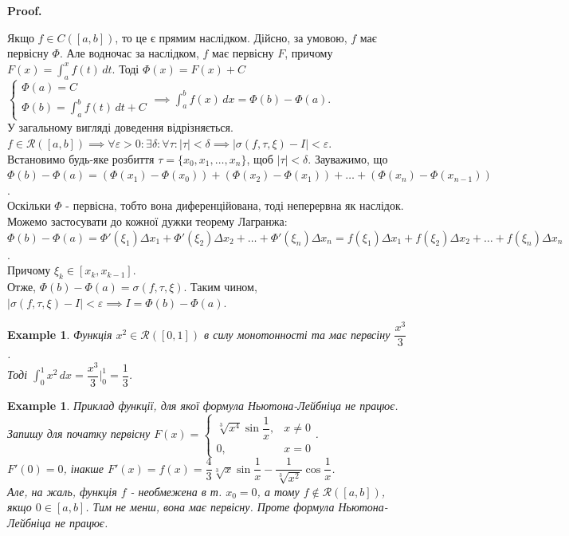 \documentclass[a4paper, 10pt]{article}
\makeatletter
\def\huge{\displaystyle}
\def\qed{$\blacksquare$}
\theoremstyle{theoremdd}
\theoremstyle{theoremdd}
\theoremstyle{theoremdd}
\theoremstyle{theoremdd}
\newtheorem{example}[theorem]{Example}
\theoremstyle{theoremdd}
\theoremstyle{theoremdd}
\theoremstyle{theoremdd}
\theoremstyle{theoremdd}
\renewenvironment{proof}[1][Proof.\\]{\par
\pushQED{\hfill \qed}%
\normalfont \topsep6\p@\@plus6\p@\relax
\trivlist
\item\relax
{\bfseries
#1\@addpunct{.}}\hspace\labelsep\ignorespaces
}{%
\popQED\endtrivlist\@endpefalse
}
\makeatother
\begin{document}
\begin{proof}
Якщо $f \in C([a,b])$, то це є прямим наслідком. Дійсно, за умовою, $f$ має первісну $\Phi$. Але водночас за наслідком, $f$ має первісну $F$, причому $F(x) = \huge\int_a^x f(t)\,dt$. Тоді $\Phi(x) = F(x) + C$\\
$\begin{cases}
\Phi(a) = C \\
\Phi(b) = \huge\int_a^b f(t)\,dt + C
\end{cases} \implies \huge\int_a^b f(x)\,dx = \Phi(b) - \Phi(a)$.
\bigskip \\
У загальному вигляді доведення відрізняється. \\
$f \in \mathcal{R}([a,b]) \implies \forall \varepsilon > 0: \exists \delta: \forall \tau: |\tau| < \delta \implies |\sigma(f, \tau, \xi)-I|<\varepsilon$.\\
Встановимо будь-яке розбиття $\tau = \{x_0,x_1,\dots,x_n\}$, щоб $|\tau| < \delta$. Зауважимо, що\\
$\Phi(b) - \Phi(a) = (\Phi(x_1)-\Phi(x_0)) + (\Phi(x_2)-\Phi(x_1)) + \dots + (\Phi(x_n)-\Phi(x_{n-1}))$.\\
Оскільки $\Phi$ - первісна, тобто вона диференційована, тоді неперервна як наслідок. Можемо застосувати до кожної дужки теорему Лагранжа:\\
$\Phi(b) - \Phi(a) = \Phi'(\xi_1) \Delta x_1 + \Phi'(\xi_2) \Delta x_2 + \dots + \Phi'(\xi_n)\Delta x_n = f(\xi_1)\Delta x_1 + f(\xi_2)\Delta x_2 + \dots + f(\xi_n)\Delta x_n$.\\
Причому $\xi_k \in [x_k,x_{k-1}]$.\\
Отже, $\Phi(b) - \Phi(a) = \sigma(f,\tau,\xi)$. Таким чином, $|\sigma(f, \tau, \xi) - I| < \varepsilon \implies I = \Phi(b) - \Phi(a)$.
\end{proof}

\begin{example}
Функція $x^2 \in \mathcal{R}([0,1])$ в силу монотонності та має первсіну $\dfrac{x^3}{3}$. \\ Тоді $\huge\int_0^1 x^2\,dx = \dfrac{x^3}{3} \Big|_0^1 = \dfrac{1}{3}$.
\end{example}

\begin{example}
Приклад функції, для якої формула Ньютона-Лейбніца не працює. Запишу для початку первісну $F(x) = \begin{cases} \sqrt[3]{x^4} \sin \dfrac{1}{x}, & x \neq 0 \\ 0, & x = 0 \end{cases}$.\\
$F'(0) = 0$, інакше $F'(x) = f(x) = \dfrac{4}{3} \sqrt[3]{x} \sin \dfrac{1}{x} - \dfrac{1}{\sqrt[3]{x^2}} \cos \dfrac{1}{x}$.\\
Але, на жаль, функція $f$ - необмежена в т. $x_0 = 0$, а тому $f \not\in \mathcal{R}([a,b])$, якщо $0 \in [a,b]$. Тим не менш, вона має первісну. Проте формула Ньютона-Лейбніца не працює.
\end{example}
\end{document}
